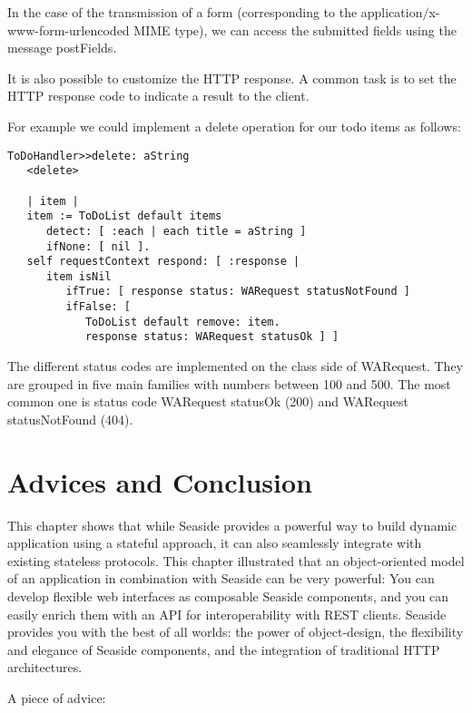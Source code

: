 \documentclass[a4paper,10pt,twoside]{book}
\newcommand{\ct}[1]{{\small\ttfamily\textup{#1}}}
\begin{document}
In the case of the transmission of a form (corresponding to the application$/$x-www-form-urlencoded MIME type), we can access the submitted fields using the message \ct{postFields}.

 It is also possible to customize the HTTP response. A common task is to set the HTTP response code to indicate a result to the client.

For example we could implement a delete operation for our todo items as follows:

\begin{lstlisting}
ToDoHandler>>delete: aString
   <delete>
   	
   | item |
   item := ToDoList default items
      detect: [ :each | each title = aString ]
      ifNone: [ nil ].
   self requestContext respond: [ :response |
      item isNil
         ifTrue: [ response status: WARequest statusNotFound ]
         ifFalse: [ 
            ToDoList default remove: item.
            response status: WARequest statusOk ] ]
\end{lstlisting}

The different status codes are implemented on the class side of WARequest. They are grouped in five main families with numbers between 100 and 500. The most common one is status code \ct{WARequest statusOk} (200) and \ct{WARequest statusNotFound} (404).

\section{Advices and Conclusion}
\label{book:advanced:restful:conclusion}

This chapter shows that while Seaside provides a powerful way to build dynamic application using a stateful approach, it can also seamlessly integrate with existing stateless protocols. This chapter illustrated that an object-oriented model of an application in combination with Seaside can be very powerful: You can develop flexible web interfaces as composable Seaside components, and you can easily enrich them with an API for interoperability with REST clients. Seaside provides you with the best of all worlds: the power of object-design, the flexibility and elegance of Seaside components, and the integration of traditional HTTP architectures.

A piece of advice: 
\end{document}
